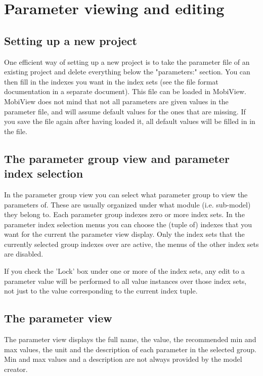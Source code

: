 \documentclass[11pt]{article}
\theoremstyle{definition}
\begin{document}
\section{Parameter viewing and editing}

\subsection{Setting up a new project}

One efficient way of setting up a new project is to take the parameter file of an existing project and delete everything below the "parameters:" section. You can then fill in the indexes you want in the index sets (see the file format documentation in a separate document). This file can be loaded in MobiView. MobiView does not mind that not all parameters are given values in the parameter file, and will assume default values for the ones that are missing. If you save the file again after having loaded it, all default values will be filled in in the file.

\subsection{The parameter group view and parameter index selection}

In the parameter group view you can select what parameter group to view the parameters of. These are usually organized under what module (i.e. sub-model) they belong to. Each parameter group indexes zero or more index sets. In the parameter index selection menus you can choose the (tuple of) indexes that you want for the current the parameter view display. Only the index sets that the currently selected group indexes over are active, the menus of the other index sets are disabled.

If you check the 'Lock' box under one or more of the index sets, any edit to a parameter value will be performed to all value instances over those index sets, not just to the value corresponding to the current index tuple.

\subsection{The parameter view}

The parameter view displays the full name, the value, the recommended min and max values, the unit and the description of each parameter in the selected group. Min and max values and a description are not always provided by the model creator.
\end{document}
